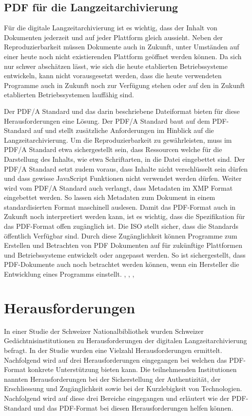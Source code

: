 \documentclass[a4paper,oneside, 12pt]{report}
\begin{document}
\section{PDF für die Langzeitarchivierung}
Für die digitale Langzeitarchivierung ist es wichtig, dass der Inhalt von Dokumenten jederzeit und auf jeder Plattform gleich aussieht. Neben der Reproduzierbarkeit müssen Dokumente auch in Zukunft, unter Umständen auf einer heute noch nicht existierenden Plattform geöffnet werden können. Da sich nur schwer abschätzen lässt, wie sich die heute etablierten Betriebssysteme entwickeln, kann nicht vorausgesetzt werden, dass die heute verwendeten Programme auch in Zukunft noch zur Verfügung stehen oder auf den in Zukunft etablierten Betriebssystemen lauffähig sind.

Der PDF/A Standard und das darin beschriebene Dateiformat bieten für diese Herausforderungen eine Lösung. Der PDF/A Standard baut auf dem PDF-Standard auf und stellt zusätzliche Anforderungen im Hinblick auf die Langzeitarchivierung. Um die Reproduzierbarkeit zu gewährleisten, muss im PDF/A Standard etwa sichergestellt sein, dass Ressourcen welche für die Darstellung des Inhalts, wie etwa Schriftarten, in die Datei eingebettet sind. Der PDF/A Standard setzt zudem voraus, dass Inhalte nicht verschlüsselt sein dürfen und dass gewisse JavaScript Funktionen nicht verwendet werden dürfen. Weiter wird vom PDF/A Standard auch verlangt, dass Metadaten im \ac{XMP} Format eingebettet werden. So lassen sich Metadaten zum Dokument in einem standardisierten Format maschinell auslesen. Damit das PDF-Format auch in Zukunft noch interpretiert werden kann, ist es wichtig, dass die Spezifikation für das PDF-Format offen zugänglich ist. Die \ac{ISO} stellt sicher, dass die Standards öffentlich Verfügbar sind. Durch diese Zugänglichkeit können Programme zum Erstellen und Betrachten von PDF Dokumenten auf für zukünftige Plattformen und Betriebssysteme entwickelt oder angepasst werden. So ist sichergestellt, dass PDF-Dokumente auch noch betrachtet werden können, wenn ein Hersteller die Entwicklung eines Programms einstellt. \cite{pdfanutshell}, \cite{Arms2005DigitalFF}, \cite{ISO32000}, \cite{ISO19005}

 
\chapter{Herausforderungen}\label{sec:herausforderungen}
In einer Studie der Schweizer Nationalbibliothek wurden Schweizer Gedächtnisinstitutionen zu Herausforderungen der digitalen Langzeitarchivierung befragt. In der Studie wurden eine Vielzahl Herausforderungen ermittelt. Nachfolgend wird auf drei Herausforderungen eingegangen bei welchen das PDF-Format konkrete Unterstützung bieten kann. Die teilnehmenden Institutionen nannten Herausforderungen bei der Sicherstellung der Authentizität, der Erschliessung und Zugänglichkeit sowie bei der Kurzlebigkeit von Technologien. Nachfolgend wird auf diese drei Bereiche eingegangen und erläutert wie der PDF-Standard und das PDF-Format bei diesen Herausforderungen helfen können. \cite{lzaschweiz}
\end{document}
